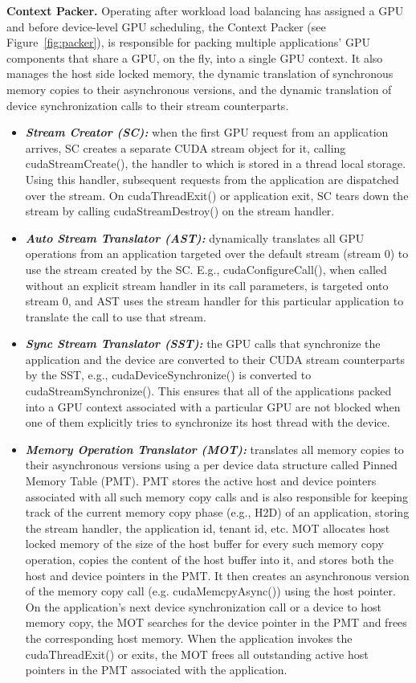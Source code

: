 \textbf{Context Packer. } Operating after workload load balancing has assigned a GPU and before device-level GPU scheduling, the Context Packer (see Figure~\ref{fig:packer}), is responsible for packing multiple applications' GPU components that share a GPU, on the fly, into a single GPU context. It also manages the host side locked memory, the dynamic translation of synchronous memory copies to their asynchronous versions, and the dynamic translation of device synchronization calls to their stream counterparts.
\begin{itemize}
\item \textbf{\textit{Stream Creator (SC): }}when the first GPU request from an application arrives, SC creates a separate CUDA stream object for it, calling cudaStreamCreate(), the handler to which is stored in a thread local storage. Using this handler, subsequent requests from the application are dispatched over the stream. On cudaThreadExit() or application exit, SC tears down the stream by calling cudaStreamDestroy() on the stream handler.
\item \textbf{\textit{Auto Stream Translator (AST): }}dynamically translates all GPU operations from an application targeted over the default  stream  (stream 0)  to use the stream created by the SC. E.g., cudaConfigureCall(),   when  called  without  an  explicit stream handler in its call parameters, is targeted onto stream 0, and  AST uses the stream handler for this particular application to translate the call to use that stream.
\item \textbf{\textit{Sync Stream Translator (SST): }}the GPU calls that synchronize the application and the device are converted to their CUDA stream counterparts by the SST, e.g., cudaDeviceSynchronize()    is     converted    to     cudaStreamSynchronize(). This ensures that all of the applications packed into a GPU context associated with a particular GPU are not blocked when one of them explicitly tries to synchronize its host thread with the device. 
\item \textbf{\textit{Memory Operation Translator (MOT): }}translates all memory copies to their asynchronous versions using a per device data structure called Pinned Memory Table (PMT).  PMT stores the active host and device pointers associated with all such memory copy calls and is also responsible for keeping track of the current memory copy phase (e.g., H2D) of an application, storing the stream handler, the application id, tenant id, etc. MOT allocates host locked memory of the size of the host buffer for every such memory copy operation, copies the content of the host buffer into it, and stores both the host and device pointers in the PMT. It then creates an asynchronous version of the memory copy call (e.g. cudaMemcpyAsync()) using the host pointer. On the application’s next device synchronization call or a device to host memory copy, the MOT searches for the device pointer in the PMT and frees the corresponding host memory. When the application invokes the cudaThreadExit() or exits, the MOT frees all outstanding active host pointers in the PMT associated with the application.
\end{itemize}

